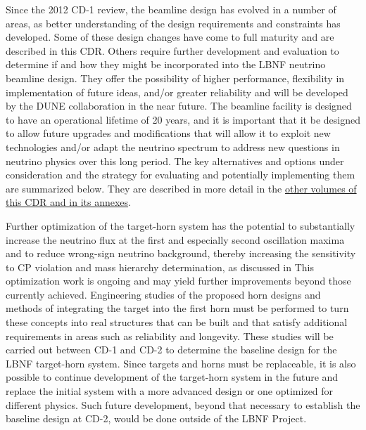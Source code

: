 Since the 2012 CD-1 review, the beamline design has evolved in a number of areas, as better understanding of the design requirements and constraints has developed.  Some of these design changes have come to full maturity and are 
described in this CDR.  Others require further development and evaluation to determine if and how they might be incorporated into the LBNF neutrino beamline design.  They offer the possibility of higher performance, flexibility in 
implementation of future ideas, and/or greater reliability and will be developed by the DUNE
collaboration in the near future. The beamline facility is designed to have an operational lifetime of 20 years, and it is important that it be designed to allow future upgrades and modifications that will allow it to 
exploit new 
technologies and/or adapt the neutrino spectrum to address new questions in neutrino physics over this long period. The key alternatives and options under consideration and the strategy for evaluating and potentially implementing them are summarized below.  They are described in more detail in the \href{https://web.fnal.gov/project/LBNF/SitePages/Proposals%20and%20Design%20Reports.aspx}{other volumes of this CDR and in its annexes}.  
               
 
Further optimization of the target-horn system has the potential to substantially increase the neutrino flux at the first and especially second oscillation maxima and to reduce wrong-sign neutrino background, thereby increasing the sensitivity to CP 
violation and mass hierarchy determination, as discussed in %
This optimization work is ongoing and may yield further improvements beyond those currently achieved. Engineering studies of the proposed horn designs and methods 
of integrating the target into the first horn must be performed to turn these concepts into real structures that can be built and that satisfy additional requirements in areas such as reliability and longevity.  These studies will be carried out between CD-1 and CD-2 to 
determine the baseline design for the LBNF target-horn system.  Since targets and horns must be replaceable, it is also possible to continue development of the target-horn system in the future and replace the initial system with a more advanced 
design or one optimized for different physics.  Such future development, beyond that necessary to establish the baseline design at CD-2, would be done outside of the LBNF Project.
 

